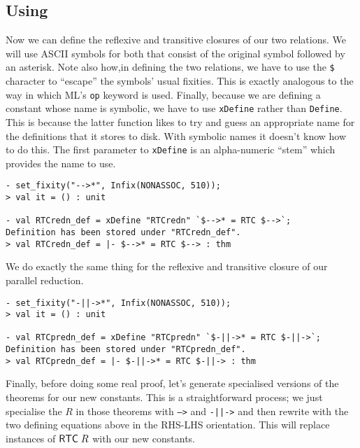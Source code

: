 \documentclass[12pt]{article}
\begin{document}
\subsection{Using }
\label{sec:Using-RTC}

Now we can define the reflexive and transitive closures of our two
relations.  We will use ASCII symbols for both that consist of the
original symbol followed by an asterisk.  Note also how,in
defining the two relations, we have to use the \texttt{\$} character
to ``escape'' the symbols' usual fixities.  This is exactly analogous
to the way in which ML's \texttt{op} keyword is used.  Finally,
because we are defining a constant whose name is symbolic, we have to
use \texttt{xDefine} rather than \texttt{Define}.  This is because the
latter function likes to try and guess an appropriate name for the
definitions that it stores to disk.  With symbolic names it doesn't
know how to do this.  The first parameter to \texttt{xDefine} is an
alpha-numeric ``stem'' which provides the name to use.
\begin{session}\begin{verbatim}
- set_fixity("-->*", Infix(NONASSOC, 510));
> val it = () : unit

- val RTCredn_def = xDefine "RTCredn" `$-->* = RTC $-->`;
Definition has been stored under "RTCredn_def".
> val RTCredn_def = |- $-->* = RTC $--> : thm
\end{verbatim}\end{session}
We do exactly the same thing for the reflexive and transitive closure
of our parallel reduction.
\begin{session}\begin{verbatim}
- set_fixity("-||->*", Infix(NONASSOC, 510));
> val it = () : unit

- val RTCpredn_def = xDefine "RTCpredn" `$-||->* = RTC $-||->`;
Definition has been stored under "RTCpredn_def".
> val RTCpredn_def = |- $-||->* = RTC $-||-> : thm
\end{verbatim}\end{session}
Finally, before doing some real proof, let's generate specialised
versions of the  theorems for our new constants.  This is a
straightforward process; we just specialise the $R$ in those theorems
with \texttt{-->} and \texttt{-||->} and then rewrite with the two
defining equations above in the RHS-LHS orientation.  This will
replace instances of ${\sf RTC}\;R$ with our new constants.
\end{document}
